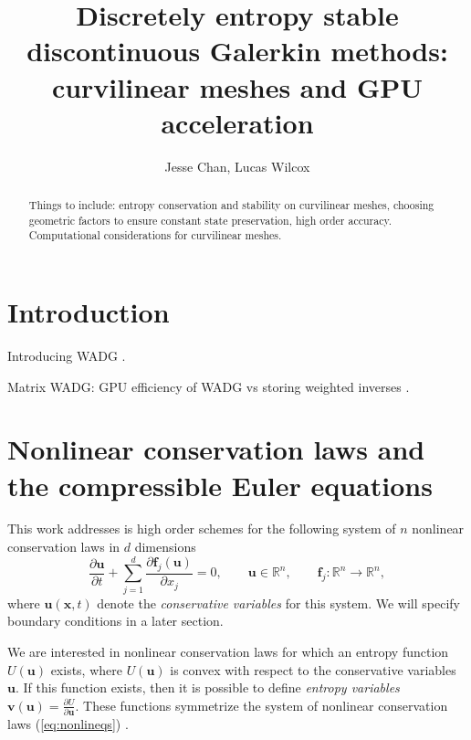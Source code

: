 \documentclass[preprint,10pt]{article}
\date{}
\author{Jesse Chan, Lucas Wilcox}
\title{Discretely entropy stable discontinuous Galerkin methods: curvilinear meshes and GPU acceleration}
\theoremstyle{definition}
\theoremstyle{lemma}
\theoremstyle{theorem}
\theoremstyle{assumption}
\newcommand{\pd}[2]{\frac{\partial#1}{\partial#2}}
\begin{document}
\maketitle

\begin{abstract}
Things to include: entropy conservation and stability on curvilinear meshes, choosing geometric factors to ensure constant state preservation, high order accuracy.  Computational considerations for curvilinear meshes.  
\end{abstract}

\section{Introduction}

Introducing WADG \cite{chan2016weight1,chan2016weight2}.  

Matrix WADG: GPU efficiency of WADG vs storing weighted inverses \cite{chan2017weight}.  

\section{Nonlinear conservation laws and the compressible Euler equations}

This work addresses is high order schemes for the following system of $n$ nonlinear conservation laws in $d$ dimensions 
\begin{equation}
\pd{\bm{u}}{t} + \sum_{j=1}^d\pd{\bm{f}_j(\bm{u})}{x_j}  = 0, \qquad \bm{u} \in \mathbb{R}^n, \qquad \bm{f}_j : \mathbb{R}^n\rightarrow \mathbb{R}^n,
\label{eq:nonlineqs}
\end{equation}
where $\bm{u}(\bm{x},t)$ denote the \emph{conservative variables} for this system.  We will specify boundary conditions in a later section.  

We are interested in nonlinear conservation laws for which an entropy function $U(\bm{u})$ exists, where $U(\bm{u})$ is convex with respect to the conservative variables $\bm{u}$.  If this function exists, then it is possible to define \emph{entropy variables} $\bm{v}(\bm{u}) = \pd{U}{\bm{u}}$.  These functions symmetrize the system of nonlinear conservation laws (\ref{eq:nonlineqs}) \cite{hughes1986new}.  
\end{document}

